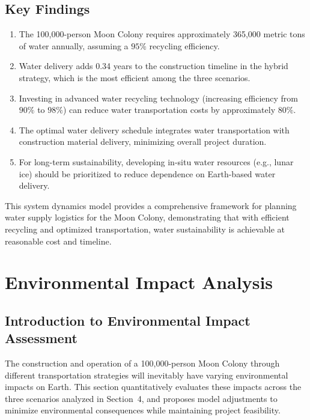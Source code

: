 \documentclass{mcmthesis}
\begin{document}
\subsection{Key Findings}

\begin{enumerate}
    \item The 100,000-person Moon Colony requires approximately 365,000 metric tons of water annually, assuming a $95\%$ recycling efficiency.
    \item Water delivery adds 0.34 years to the construction timeline in the hybrid strategy, which is the most efficient among the three scenarios.
    \item Investing in advanced water recycling technology (increasing efficiency from $90\%$ to $98\%$) can reduce water transportation costs by approximately $80\%$.
    \item The optimal water delivery schedule integrates water transportation with construction material delivery, minimizing overall project duration.
    \item For long-term sustainability, developing in-situ water resources (e.g., lunar ice) should be prioritized to reduce dependence on Earth-based water delivery.
\end{enumerate}

This system dynamics model provides a comprehensive framework for planning water supply logistics for the Moon Colony, demonstrating that with efficient recycling and optimized transportation, water sustainability is achievable at reasonable cost and timeline.


\section{Environmental Impact Analysis}

\subsection{Introduction to Environmental Impact Assessment}

The construction and operation of a 100,000-person Moon Colony through different transportation strategies will inevitably have varying environmental impacts on Earth. This section quantitatively evaluates these impacts across the three scenarios analyzed in Section~4, and proposes model adjustments to minimize environmental consequences while maintaining project feasibility.
\end{document}
